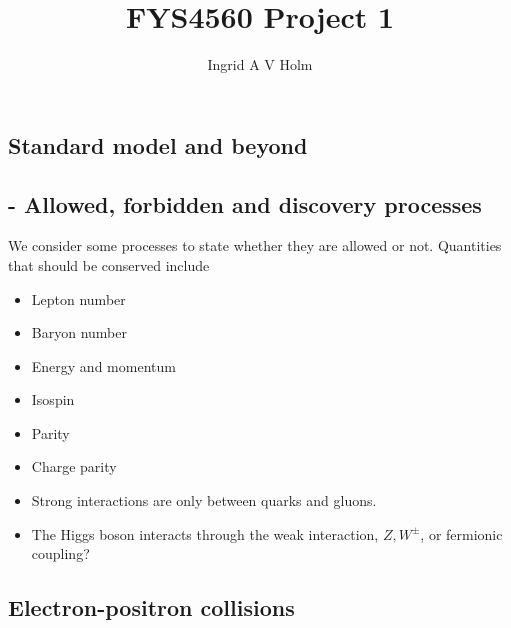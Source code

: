 \documentclass[11pt]{article}
\begin{document}
\title{FYS4560 Project 1}
\author{Ingrid A V Holm}
\maketitle

\begin{multicols}{2}
\section{Standard model and beyond}
\subsection*{- Allowed, forbidden and discovery processes}

\begin{flushleft}
We consider some processes to state whether they are allowed or not. Quantities that should be conserved include
\begin{itemize}
\item Lepton number
\item Baryon number
\item Energy and momentum
\item Isospin
\item Parity
\item Charge parity
\item Strong interactions are only between quarks and gluons.
\item The Higgs boson interacts through the weak interaction, $Z, W^{\pm}$, or fermionic coupling?
\end{itemize}
\end{flushleft}

\subsection*{Electron-positron collisions}


\end{multicols}
\end{document}

